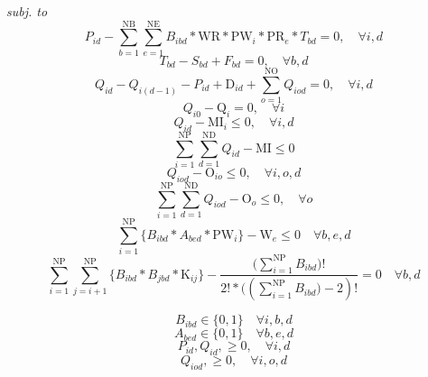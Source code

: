 \emph{subj. to}
\begin{equation}
	P_{id} - \sum_{b=1}^{\mathrm{NB}}{\sum_{e=1}^{\mathrm{NE}}{B_{ibd}*\mathrm{WR}*\mathrm{PW}_i*\mathrm{PR}_e*T_{bd}}}  = 0, \quad \forall{i, d}
	\label{eq:prodQt}
\end{equation}
\begin{equation}
	T_{bd} - S_{bd} + F_{bd} = 0, \quad \forall{b, d}
	\label{eq:timeCalc}
\end{equation}
\begin{equation}
	Q_{id} - Q_{i(d-1)} - P_{id} + \mathrm{D}_{id} + \sum_{o=1}^{\mathrm{NO}}{Q_{iod}} = 0 , \quad \forall{i, d}
	\label{eq:demSat}
\end{equation}
\begin{equation}
	Q_{i0} - \mathrm{Q}_i = 0, \quad \forall{i}
	\label{eq:demSatBC}
\end{equation}
\begin{equation}
	Q_{id} - \mathrm{MI}_i \leq 0, \quad \forall{i, d}
	\label{eq:invResByProd}
\end{equation}
\begin{equation}
	\sum_{i=1}^{\mathrm{NP}}{\sum_{d=1}^{\mathrm{ND}}{Q_{id}}} - \mathrm{MI} \leq 0
	\label{eq:invRes}
\end{equation}
\begin{equation}
	Q_{iod} - \mathrm{O}_{io} \leq 0, \quad \forall{i, o, d}
	\label{eq:outInvResByProd}
\end{equation}
\begin{equation}
	\sum_{i=1}^{\mathrm{NP}}{\sum_{d=1}^{\mathrm{ND}}{Q_{iod}}} - \mathrm{O}_o \leq 0, \quad \forall{o}
	\label{eq:outInvRes}
\end{equation}
\begin{equation}
	\sum_{i=1}^{\mathrm{NP}}\{B_{ibd}*A_{bed}*\mathrm{PW}_i\} - \mathrm{W}_e \leq 0 \quad \forall{b, e, d}
	\label{eq:widthCap}
\end{equation}
\begin{equation}
	\sum_{i=1}^{\mathrm{NP}}{\sum_{j=i+1}^{\mathrm{NP}}\{B_{ibd}*B_{jbd}*\mathrm{K}_{ij}\}} - \frac{(\sum_{i=1}^{\mathrm{NP}}{B_{ibd})}! }{2! * ((\sum_{i=1}^{\mathrm{NP}}{B_{ibd})} -2)!} = 0 \quad \forall{b, d}
	\label{eq:colourRest}
\end{equation}



\begin{equation}
	B_{ibd}  \in \{0,1\} \quad \forall{i, b, d}
	\label{eq:natVarBinB}
\end{equation}
\begin{equation}
	A_{bed}  \in \{0,1\} \quad \forall{b, e, d}
	\label{eq:natVarBinA}
\end{equation}
\begin{equation}
	P_{id}, Q_{id},  \geq 0, \quad \forall{i, d}
	\label{eq:natVar}
\end{equation}
\begin{equation}
	Q_{iod},  \geq 0, \quad \forall{i, o, d}
	\label{eq:natVarO}
\end{equation}

